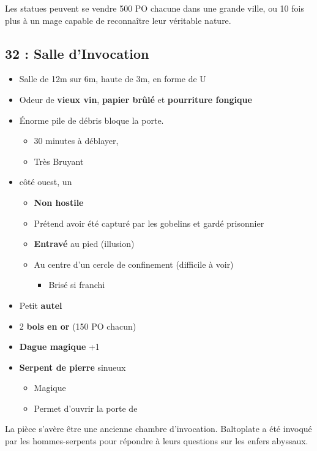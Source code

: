 Les statues peuvent se vendre 500 PO chacune dans une grande ville, ou 10 fois plus à un mage capable de reconnaître leur véritable nature.

\vfill

\subsection{32 : Salle d'Invocation}\label{n3:s32}
\begin{itemize}
  \item Salle de 12m sur 6m, haute de 3m, en forme de U
  \item Odeur de \textbf{vieux vin}, \textbf{papier brûlé} et \textbf{pourriture fongique}
  \item \'Enorme pile de débris bloque la porte.
  \begin{itemize}
    \item 30 minutes à déblayer,
    \item Très Bruyant
  \end{itemize}
  \item côté ouest, un \textbf{}
  \begin{itemize}
    \item \textbf{Non hostile}
    \item Prétend avoir été capturé par les gobelins et gardé prisonnier
    \item \textbf{Entravé} au pied (illusion)
    \item Au centre d'un cercle de confinement (difficile à voir)
    \begin{itemize}
      \item Brisé si franchi
    \end{itemize}
  \end{itemize}
  \item Petit \textbf{autel}
  \item 2 \textbf{bols en or} (150 PO chacun)
  \item \textbf{Dague magique} +1
  \item \textbf{Serpent de pierre} sinueux
  \begin{itemize}
    \item Magique
    \item Permet d'ouvrir la porte de 
  \end{itemize}
\end{itemize}

La pièce s'avère être une ancienne chambre d'invocation.
Baltoplate a été invoqué par les hommes-serpents pour répondre à leurs questions sur les enfers abyssaux.


